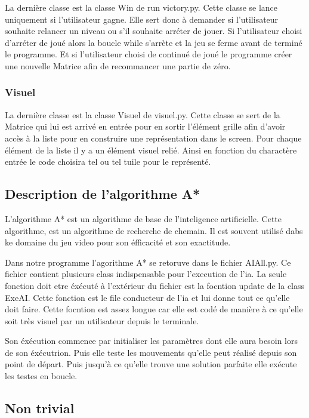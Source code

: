 \documentclass[a4paper,12pt]{article} %
\begin{document}
La dernière classe est la classe Win de run victory.py.
Cette classe se lance uniquement si l'utilisateur gagne.
Elle sert donc à demander si l'utilisateur souhaite relancer un niveau ou s'il souhaite arréter de jouer.
Si l'utilisateur choisi d'arréter de joué alors la boucle while s'arrète et la jeu se ferme avant de terminé le programme.
Et si l'utilisateur choisi de continué de joué le programme créer une nouvelle Matrice afin de recommancer une partie de zéro.

\subsubsection{Visuel}

La dernière classe est la classe Visuel de visuel.py.
Cette classe se sert de la Matrice qui lui est arrivé en entrée pour en sortir l'élément grille afin d'avoir accès à la liste pour en construire une représentation dans le screen.
Pour chaque élément de la liste il y a un élément visuel relié.
Ainsi en fonction du charactère entrée le code choisira tel ou tel tuile pour le représenté.

\subsection{Description de l'algorithme A*}

L'algorithme A* est un algorithme de base de l'inteligence artificielle.
Cette algorithme, est un algorithme de recherche de chemain.
Il est souvent utilisé dabs ke domaine du jeu video pour son éfficacité et son exactitude.

Dans notre programme l'agorithme A* se retoruve dans le fichier AIAll.py.
Ce fichier contient plusieurs class indispensable pour l'execution de l'ia.
La seule fonction doit etre éxécuté à l'extérieur du fichier est la focntion update de la class ExeAI.
Cette fonction est le file conducteur de l'ia et lui donne tout ce qu'elle doit faire.
Cette focntion est assez longue car elle est codé de manière à ce qu'elle soit très visuel par un utilisateur depuis le terminale.

Son éxécution commence par initialiser les paramètres dont elle aura besoin lors de son éxécutrion.
Puis elle teste les mouvements qu'elle peut réalisé depuis son point de départ.
Puis jusqu'à ce qu'elle trouve une solution parfaite elle exécute les testes en boucle.

\subsection{Non trivial}
\end{document}
